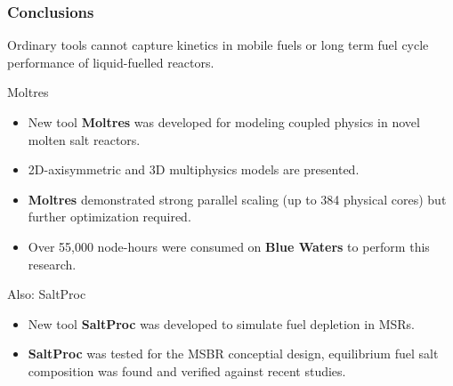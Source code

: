 \begin{frame}
  \frametitle{Conclusions}
  Ordinary tools cannot capture kinetics in mobile fuels or long term fuel 
        cycle performance of liquid-fuelled reactors. 
        \begin{block}{Moltres}
		\begin{itemize}
		\item New tool \textbf{Moltres} was developed for modeling coupled physics in novel molten salt reactors.
		\item 2D-axisymmetric and 3D multiphysics models are presented.
		\item \textbf{Moltres} demonstrated strong parallel scaling (up to 384 physical cores) but further optimization required.
		\item Over 55,000 node-hours were consumed on \textbf{Blue Waters} to perform this research.
        \end{itemize}
        \end{block}
        \begin{block}{Also: SaltProc}
                \begin{itemize}
                \item New tool \textbf{SaltProc} was developed to simulate fuel 
                        depletion in \glspl{MSR}.
                \item \textbf{SaltProc} was tested for the \gls{MSBR} conceptial design, equilibrium fuel salt composition was found and verified against recent studies.
		\end{itemize}
        \end{block}
        
\end{frame}
